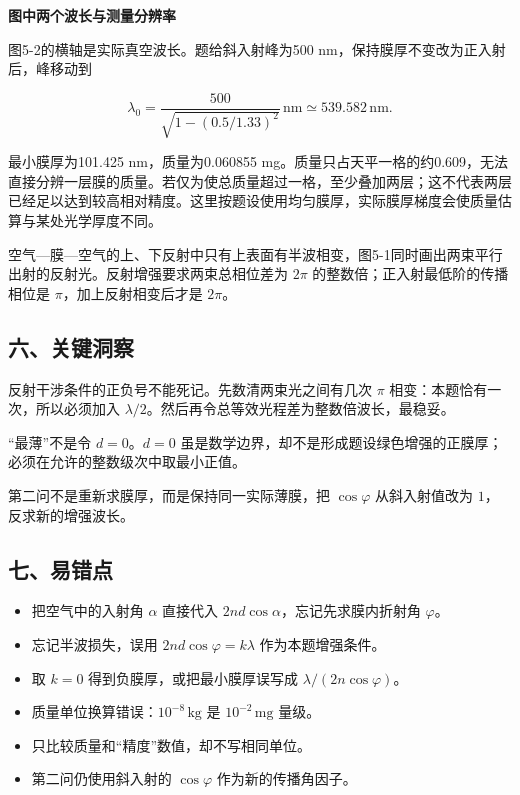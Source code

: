 \documentclass[12pt,a4paper,UTF8]{ctexart}
\newcommand{\tightlist}{\setlength{\itemsep}{0pt}\setlength{\parskip}{0pt}}
\begin{document}
\textbf{图中两个波长与测量分辨率}

图5-2的横轴是实际真空波长。题给斜入射峰为500
nm，保持膜厚不变改为正入射后，峰移动到

\[\lambda_0=\frac{500}{\sqrt{1-(0.5/1.33)^2}}\,\mathrm{nm}
\simeq539.582\,\mathrm{nm}.\]

最小膜厚为101.425 nm，质量为0.060855
mg。质量只占天平一格的约0.609，无法直接分辨一层膜的质量。若仅为使总质量超过一格，至少叠加两层；这不代表两层已经足以达到较高相对精度。这里按题设使用均匀膜厚，实际膜厚梯度会使质量估算与某处光学厚度不同。

空气---膜---空气的上、下反射中只有上表面有半波相变，图5-1同时画出两束平行出射的反射光。反射增强要求两束总相位差为
\(2\pi\) 的整数倍；正入射最低阶的传播相位是 \(\pi\)，加上反射相变后才是
\(2\pi\)。

\subsection{六、关键洞察}\label{ux516dux5173ux952eux6d1eux5bdf-4}

反射干涉条件的正负号不能死记。先数清两束光之间有几次 \(\pi\)
相变：本题恰有一次，所以必须加入
\(\lambda/2\)。然后再令总等效光程差为整数倍波长，最稳妥。

``最薄''不是令 \(d=0\)。\(d=0\)
虽是数学边界，却不是形成题设绿色增强的正膜厚；必须在允许的整数级次中取最小正值。

第二问不是重新求膜厚，而是保持同一实际薄膜，把 \(\cos\varphi\)
从斜入射值改为 \(1\)，反求新的增强波长。

\subsection{七、易错点}\label{ux4e03ux6613ux9519ux70b9-4}

\begin{itemize}
\tightlist
\item
  把空气中的入射角 \(\alpha\) 直接代入
  \(2nd\cos\alpha\)，忘记先求膜内折射角 \(\varphi\)。
\item
  忘记半波损失，误用 \(2nd\cos\varphi=k\lambda\) 作为本题增强条件。
\item
  取 \(k=0\) 得到负膜厚，或把最小膜厚误写成
  \(\lambda/(2n\cos\varphi)\)。
\item
  质量单位换算错误：\(10^{-8}\,\mathrm{kg}\) 是 \(10^{-2}\,\mathrm{mg}\)
  量级。
\item
  只比较质量和``精度''数值，却不写相同单位。
\item
  第二问仍使用斜入射的 \(\cos\varphi\) 作为新的传播角因子。
\end{itemize}
\end{document}
